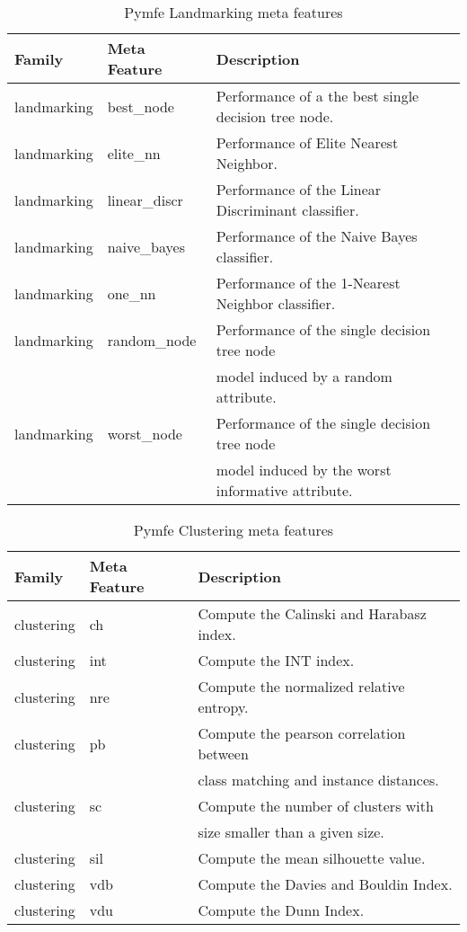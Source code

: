 \begin{table}[h!]
  \centering
  \caption{Pymfe Landmarking meta features}
  \setlength{\tabcolsep}{8pt}
    \renewcommand{\arraystretch}{1.2}
      \begin{tabular}{lll}
        \hline
      Family & Meta Feature & Description \\
      \hline
      landmarking & best\_node & Performance of a the best single decision tree node.\\
      landmarking & elite\_nn & Performance of Elite Nearest Neighbor.\\
      landmarking & linear\_discr & Performance of the Linear Discriminant classifier.\\
      landmarking & naive\_bayes & Performance of the Naive Bayes classifier.\\
      landmarking & one\_nn & Performance of the 1-Nearest Neighbor classifier.\\
      landmarking & random\_node & Performance of the single decision tree node\\ & & model induced by a random attribute.\\
      landmarking & worst\_node & Performance of the single decision tree node\\ & & model induced by the worst informative attribute.\\\hline
  \end{tabular}
  \label{tab:pymfe-landmarking-mf}
\end{table}

\begin{table}[h!]
  \centering
  \caption{Pymfe Clustering meta features}
  \setlength{\tabcolsep}{8pt}
    \renewcommand{\arraystretch}{1.2}
      \begin{tabular}{lll}
      \hline
      Family & Meta Feature & Description \\ \hline
      clustering & ch & Compute the Calinski and Harabasz index. \\
      clustering & int & Compute the INT index.\\
      clustering & nre & Compute the normalized relative entropy.\\
      clustering & pb & Compute the pearson correlation between \\
      & & class matching and instance distances.\\
      clustering & sc & Compute the number of clusters with\\ & & size smaller than a given size.\\
      clustering & sil & Compute the mean silhouette value.\\
      clustering & vdb & Compute the Davies and Bouldin Index.\\
      clustering & vdu & Compute the Dunn Index.\\ \hline
    \end{tabular}
    \label{tab:pymfe-clustering-mf}
  \end{table}

